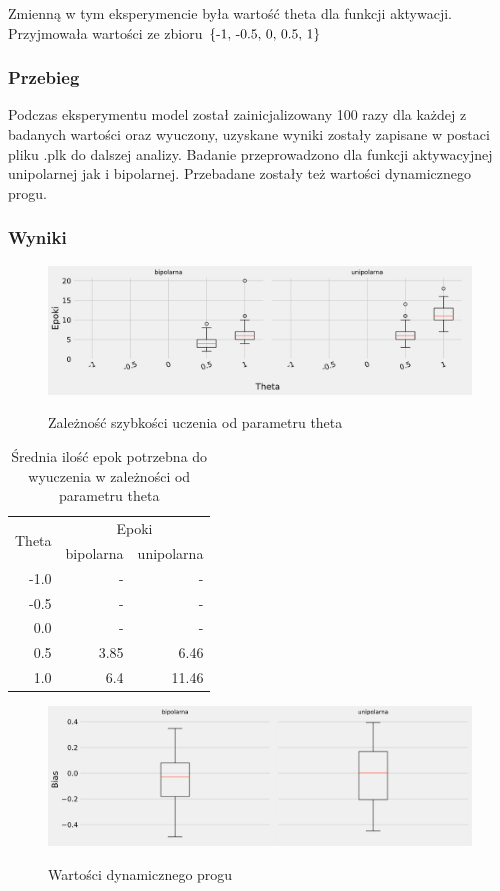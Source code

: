 \documentclass{article}
\begin{document}
Zmienną w tym eksperymencie była wartość theta dla funkcji aktywacji. Przyjmowała wartości ze zbioru \(\{$-1, -0.5, 0, 0.5, 1$\}\)
\subsubsection*{Przebieg}

Podczas eksperymentu model został zainicjalizowany 100 razy dla każdej z badanych wartości oraz wyuczony, uzyskane wyniki zostały zapisane w postaci pliku .plk do dalszej analizy. Badanie przeprowadzono dla funkcji aktywacyjnej unipolarnej jak i bipolarnej. Przebadane zostały też wartości dynamicznego progu.

\subsubsection*{Wyniki}
\begin{figure}[h]
	\centering
	\caption{Zależność szybkości uczenia od parametru theta}
	\includegraphics[width=\textwidth]{per_theta.png}
	\label{fig:res11}
\end{figure}

\begin{table}[h]
	\caption{Średnia ilość epok potrzebna do wyuczenia w zależności od parametru theta}
	\label{tabela-res-11}
	\centering
	\begin{tabular}{rrr}
		\toprule
		\multirow{2}{*}{Theta}   & \multicolumn{2}{c}{Epoki} \\
		     & bipolarna & unipolarna \\
		\midrule
		-1.0 & -         & -          \\
		-0.5 & -         & -          \\
		0.0  & -         & -          \\
		0.5  & 3.85      & 6.46       \\
		1.0  & 6.4       & 11.46      \\
		\bottomrule
	\end{tabular}
\end{table}

\begin{figure}[h]
	\centering
	\caption{Wartości dynamicznego progu}
	\includegraphics[width=\textwidth]{per_bias.png}
	\label{fig:res12}
\end{figure}
\end{document}
